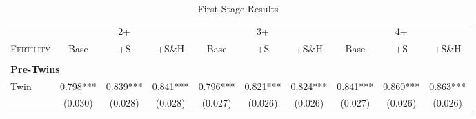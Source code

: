 \begin{landscape}\begin{table}[htpb!]\caption{First Stage Results} 
\label{TWINtab:FS}\vspace{-5mm}\begin{center}\begin{tabular}{lccccccccc}
\toprule \toprule 
&\multicolumn{3}{c}{2+}&\multicolumn{3}{c}{3+}&\multicolumn{3}{c}{4+}\\ \cmidrule(r){2-4} \cmidrule(r){5-7} \cmidrule(r){8-10} 
\textsc{Fertility}&Base&+S&+S\&H&Base&+S&+S\&H&Base&+S&+S\&H\\ \midrule 
\begin{footnotesize}\end{footnotesize}& 
\begin{footnotesize}\end{footnotesize}& 
\begin{footnotesize}\end{footnotesize}& 
\begin{footnotesize}\end{footnotesize}& 
\begin{footnotesize}\end{footnotesize}& 
\begin{footnotesize}\end{footnotesize}& 
\begin{footnotesize}\end{footnotesize}& 
\begin{footnotesize}\end{footnotesize}& 
\begin{footnotesize}\end{footnotesize}& 
\begin{footnotesize}\end{footnotesize}\\ 
\multicolumn{10}{l}{\textbf{Pre-Twins}}\\ 
Twin&0.798***&0.839***&0.841***&0.796***&0.821***&0.824***&0.841***&0.860***&0.863***\\
&(0.030)&(0.028)&(0.028)&(0.027)&(0.026)&(0.026)&(0.027)&(0.026)&(0.026)\\

\end{tabular}
\end{center}
\end{table}
\end{landscape}
